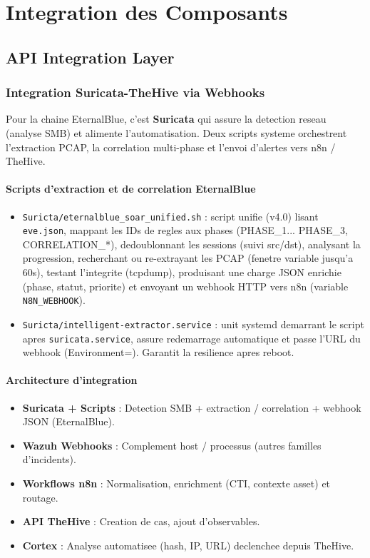 \section{Integration des Composants}

\subsection{API Integration Layer}

\subsubsection{Integration Suricata-TheHive via Webhooks}

Pour la chaine EternalBlue, c'est \textbf{Suricata} qui assure la detection reseau (analyse SMB) et alimente l'automatisation. Deux scripts systeme orchestrent l'extraction PCAP, la correlation multi-phase et l'envoi d'alertes vers n8n / TheHive.

\paragraph{Scripts d'extraction et de correlation EternalBlue}
\begin{itemize}
  \item \texttt{Suricta/eternalblue\_soar\_unified.sh} : script unifie (v4.0) lisant \texttt{eve.json}, mappant les IDs de regles aux phases (PHASE\_1... PHASE\_3, CORRELATION\_*), dedoublonnant les sessions (suivi src/dst), analysant la progression, recherchant ou re-extrayant les PCAP (fenetre variable jusqu'a 60s), testant l'integrite (tcpdump), produisant une charge JSON enrichie (phase, statut, priorite) et envoyant un webhook HTTP vers n8n (variable \texttt{N8N\_WEBHOOK}).
  \item \texttt{Suricta/intelligent-extractor.service} : unit systemd demarrant le script apres \texttt{suricata.service}, assure redemarrage automatique et passe l'URL du webhook (Environment=). Garantit la resilience apres reboot.
\end{itemize}

\paragraph{Architecture d'integration}
\begin{itemize}
  \item \textbf{Suricata + Scripts} : Detection SMB + extraction / correlation + webhook JSON (EternalBlue).
  \item \textbf{Wazuh Webhooks} : Complement host / processus (autres familles d'incidents).
  \item \textbf{Workflows n8n} : Normalisation, enrichment (CTI, contexte asset) et routage.
  \item \textbf{API TheHive} : Creation de cas, ajout d'observables.
  \item \textbf{Cortex} : Analyse automatisee (hash, IP, URL) declenchee depuis TheHive.
\end{itemize}

